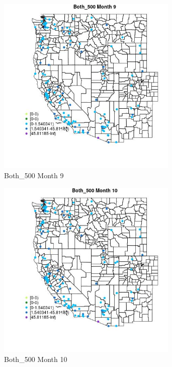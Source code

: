 \begin{figure} 
\centering  
\includegraphics[width=0.77\textwidth]{Code_Outputs/Report_ML_input_PM25_Step4_part_e_de_duplicated_aves_MapObsMo9Both_500.jpg} 
\caption{\label{fig:Report_ML_input_PM25_Step4_part_e_de_duplicated_avesMapObsMo9Both_500}Both_500 Month 9} 
\end{figure} 
 

\begin{figure} 
\centering  
\includegraphics[width=0.77\textwidth]{Code_Outputs/Report_ML_input_PM25_Step4_part_e_de_duplicated_aves_MapObsMo10Both_500.jpg} 
\caption{\label{fig:Report_ML_input_PM25_Step4_part_e_de_duplicated_avesMapObsMo10Both_500}Both_500 Month 10} 
\end{figure} 
 

